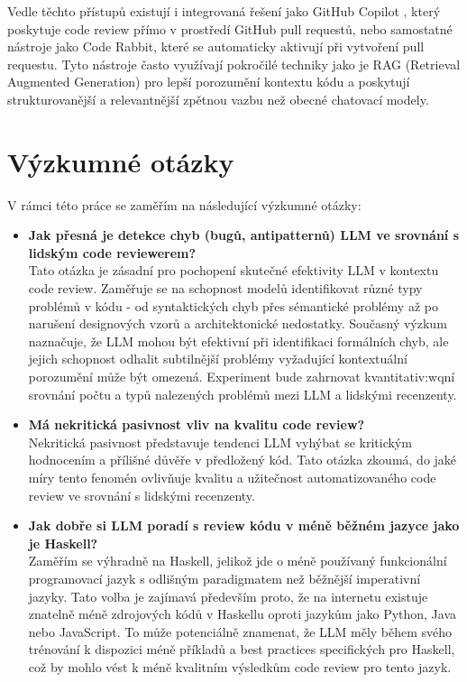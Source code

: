 \documentclass[12pt, a4paper]{article}
\begin{document}
Vedle těchto přístupů existují i integrovaná řešení jako GitHub Copilot \cite{copilot2023}, který poskytuje code review přímo v prostředí GitHub pull requestů, nebo samostatné nástroje jako Code Rabbit, které se automaticky aktivují při vytvoření pull requestu. Tyto nástroje často využívají pokročilé techniky jako je RAG (Retrieval Augmented Generation) pro lepší porozumění kontextu kódu a poskytují strukturovanější a relevantnější zpětnou vazbu než obecné chatovací modely.


\section{Výzkumné otázky}
V rámci této práce se zaměřím na následující výzkumné otázky:
\begin{itemize}
  \item \textbf{Jak přesná je detekce chyb (bugů, antipatternů) LLM ve srovnání s lidským code reviewerem?}\\
  Tato otázka je zásadní pro pochopení skutečné efektivity LLM v kontextu code review. Zaměřuje se na schopnost modelů identifikovat různé typy problémů v kódu - od syntaktických chyb přes sémantické problémy až po narušení designových vzorů a architektonické nedostatky. Současný výzkum naznačuje, že LLM mohou být efektivní při identifikaci formálních chyb, ale jejich schopnost odhalit subtilnější problémy vyžadující kontextuální porozumění může být omezená. Experiment bude zahrnovat kvantitativ:wqní srovnání počtu a typů nalezených problémů mezi LLM a lidskými recenzenty.
  \item \textbf{Má nekritická pasivnost vliv na kvalitu code review?}\\
  Nekritická pasivnost představuje tendenci LLM vyhýbat se kritickým hodnocením a přílišné důvěře v předložený kód. Tato otázka zkoumá, do jaké míry tento fenomén ovlivňuje kvalitu a užitečnost automatizovaného code review ve srovnání s lidskými recenzenty.
  \item \textbf{Jak dobře si LLM poradí s review kódu v méně běžném jazyce jako je Haskell?}\\
  Zaměřím se výhradně na Haskell, jelikož jde o méně používaný funkcionální programovací jazyk s odlišným paradigmatem než běžnější imperativní jazyky. Tato volba je zajímavá především proto, že na internetu existuje znatelně méně zdrojových kódů v Haskellu oproti jazykům jako Python, Java nebo JavaScript. To může potenciálně znamenat, že LLM měly během svého trénování k dispozici méně příkladů a best practices specifických pro Haskell, což by mohlo vést k méně kvalitním výsledkům code review pro tento jazyk.
\end{itemize}
\end{document}
